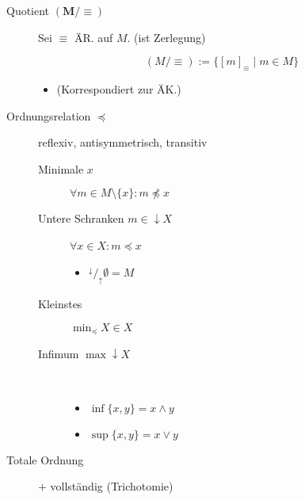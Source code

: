 \begin{mzImportant}
\begin{description}
    \item [Quotient $\mathbf{(M / \equiv)}$]
          Sei $\equiv$ ÄR. auf $M$. (ist Zerlegung)

          $$(M / \equiv) := \{ [m]_\equiv \mid m \in M \}$$

          \begin{itemize}
            \item (Korrespondiert zur ÄK.)
          \end{itemize}

    \item [Ordnungsrelation $\boldsymbol{\preceq}$]
          reflexiv, antisymmetrisch, transitiv

          \begin{description}
            \item [Minimale $x$] $\forall m \in M \setminus \{ x \}: m \not\preceq x$

            \item [Untere Schranken $m \in \downarrow X$] $\forall x \in X: m \preceq x$\

                  \begin{itemize}
                    \item ${}^{\downarrow}/_{\uparrow} \emptyset = M$
                  \end{itemize}

            \item [Kleinstes] $\min_\preceq X \in X$

            \item [Infimum $\max \downarrow X$]\
                  \index{Supremum}

                  \begin{itemize}
                    \item $\inf \{ x, y \} = x \land y$
                    \item $\sup \{ x, y \} = x \lor y$
                  \end{itemize}
          \end{description}

    \item [Totale Ordnung] $+$ vollständig (Trichotomie)
  \end{description}
\end{mzImportant}

